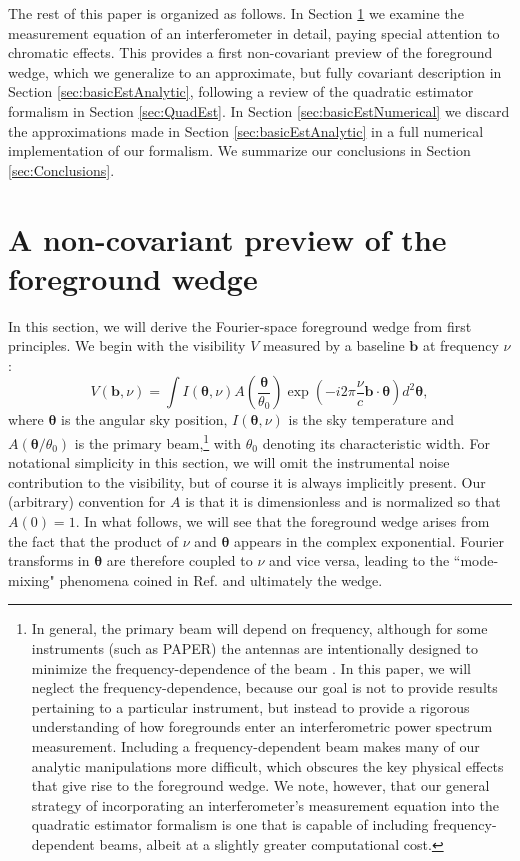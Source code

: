 \documentclass[twocolumn,aps,prd,nofootinbib,showpacs]{revtex4-1}
\begin{document}
The rest of this paper is organized as follows.  In Section \ref{sec:InstrumentResponse} we examine the measurement equation of an interferometer in detail, paying special attention to chromatic effects.  This provides a first non-covariant preview of the foreground wedge, which we generalize to an approximate, but fully covariant description in Section \ref{sec:basicEstAnalytic}, following a review of the quadratic estimator formalism in Section \ref{sec:QuadEst}.  In Section \ref{sec:basicEstNumerical} we discard the approximations made in Section \ref{sec:basicEstAnalytic} in a full numerical implementation of our formalism.  We summarize our conclusions in Section \ref{sec:Conclusions}.

\section{A non-covariant preview of the foreground wedge}
\label{sec:InstrumentResponse}
In this section, we will derive the Fourier-space foreground wedge from first principles.  We begin with the visibility $V$ measured by a baseline $\mathbf{b}$ at frequency $\nu$:
\begin{equation}
\label{eq:basicVis}
V(\mathbf{b}, \nu) = \int  I (\boldsymbol \theta, \nu)  A \left( \frac{\boldsymbol \theta}{\theta_0} \right)\exp \left( - i 2 \pi \frac{\nu}{c} \mathbf{b} \cdot \boldsymbol \theta \right)  d^2 \mathbf{\theta},
\end{equation}
where $\boldsymbol \theta$ is the angular sky position, $I (\boldsymbol \theta , \nu)$ is the sky temperature and $A(\boldsymbol \theta / \theta_0 )$ is the primary beam,\footnote{In general, the primary beam will depend on frequency, although for some instruments (such as PAPER) the antennas are intentionally designed to minimize the frequency-dependence of the beam \cite{Parsons2010}.  In this paper, we will neglect the frequency-dependence, because our goal is not to provide results pertaining to a particular instrument, but instead to provide a rigorous understanding of how foregrounds enter an interferometric power spectrum measurement.  Including a frequency-dependent beam makes many of our analytic manipulations more difficult, which obscures the key physical effects that give rise to the foreground wedge.  We note, however, that our general strategy of incorporating an interferometer's measurement equation into the quadratic estimator formalism is one that is capable of including frequency-dependent beams, albeit at a slightly greater computational cost.} with $\theta_0$ denoting its characteristic width.  For notational simplicity in this section, we will omit the instrumental noise contribution to the visibility, but of course it is always implicitly present.  Our (arbitrary) convention for $A$ is that it is dimensionless and is normalized so that $A(0)=1$.  In what follows, we will see that the foreground wedge arises from the fact that the product of $\nu$ and $\boldsymbol \theta$ appears in the complex exponential.  Fourier transforms in $\boldsymbol \theta$ are therefore coupled to $\nu$ and vice versa, leading to the ``mode-mixing" phenomena coined in Ref. \cite{Morales2012} and ultimately the wedge.
\end{document}
